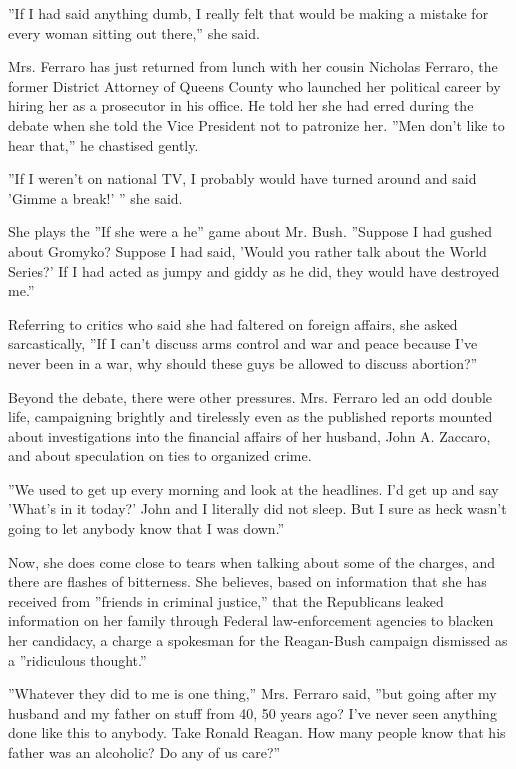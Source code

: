 ''If I had said anything dumb, I really felt that would be making a
mistake for every woman sitting out there,'' she said.

Mrs. Ferraro has just returned from lunch with her cousin Nicholas
Ferraro, the former District Attorney of Queens County who launched her
political career by hiring her as a prosecutor in his office. He told
her she had erred during the debate when she told the Vice President not
to patronize her. ''Men don't like to hear that,'' he chastised gently.

''If I weren't on national TV, I probably would have turned around and
said 'Gimme a break!' '' she said.

She plays the ''If she were a he'' game about Mr. Bush. ''Suppose I had
gushed about Gromyko? Suppose I had said, 'Would you rather talk about
the World Series?' If I had acted as jumpy and giddy as he did, they
would have destroyed me.''

Referring to critics who said she had faltered on foreign affairs, she
asked sarcastically, ''If I can't discuss arms control and war and peace
because I've never been in a war, why should these guys be allowed to
discuss abortion?''

Beyond the debate, there were other pressures. Mrs. Ferraro led an odd
double life, campaigning brightly and tirelessly even as the published
reports mounted about investigations into the financial affairs of her
husband, John A. Zaccaro, and about speculation on ties to organized
crime.

''We used to get up every morning and look at the headlines. I'd get up
and say 'What's in it today?' John and I literally did not sleep. But I
sure as heck wasn't going to let anybody know that I was down.''

Now, she does come close to tears when talking about some of the
charges, and there are flashes of bitterness. She believes, based on
information that she has received from ''friends in criminal justice,''
that the Republicans leaked information on her family through Federal
law-enforcement agencies to blacken her candidacy, a charge a spokesman
for the Reagan-Bush campaign dismissed as a ''ridiculous thought.''

''Whatever they did to me is one thing,'' Mrs. Ferraro said, ''but going
after my husband and my father on stuff from 40, 50 years ago? I've
never seen anything done like this to anybody. Take Ronald Reagan. How
many people know that his father was an alcoholic? Do any of us care?''

